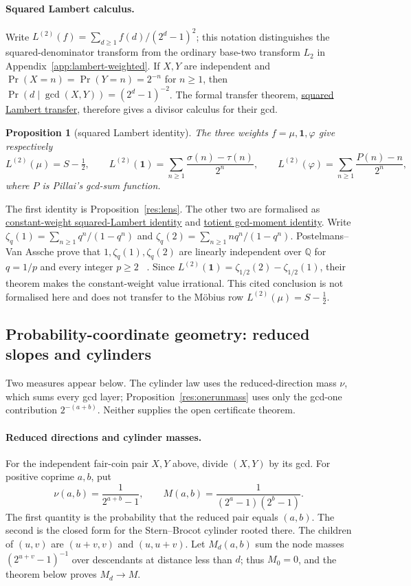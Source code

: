 \documentclass[11pt]{article}
\newcommand{\commit}{312b96c0d149ed466725c62d4ef24cfc91bca34e}
\newcommand{\repobase}{https://github.com/wcook04/plectis-lean-erdos249-257/blob/\commit}
\newcommand{\PK}{Erdos249257}
\newcommand{\lword}[4]{\href{\repobase/\PK/#1\#L#2}{#4}}
\newtheorem{proposition}[theorem]{Proposition}
\theoremstyle{definition}
\theoremstyle{remark}
\newcommand{\Q}{\mathbb{Q}}
\newcommand{\ph}{\varphi}
\begin{document}
{\paragraph{Squared Lambert calculus.}\label{sec:squared}
Write \(L^{(2)}(f)=\sum_{d\ge1}f(d)/(2^d-1)^2\); this notation distinguishes
the squared-denominator transform from the ordinary base-two transform $L_2$
in Appendix~\ref{app:lambert-weighted}.  If $X,Y$ are independent and
$\Pr(X=n)=\Pr(Y=n)=2^{-n}$ for $n\ge1$, then
$\Pr(d\mid\gcd(X,Y))=(2^d-1)^{-2}$.  The formal transfer theorem,
\lword{GcdMomentCalculus.lean}{105}{tsum_lambert_linear_weight_sq_pure}{squared Lambert transfer},
therefore gives a divisor calculus for their gcd.
\begin{proposition}[squared Lambert identity]\label{res:gcdmoment}
The three weights \(f=\mu,\mathbf 1,\ph\) give respectively
\[
 L^{(2)}(\mu)=S-\tfrac12,\qquad
 L^{(2)}(\mathbf 1)=\sum_{n\ge1}\frac{\sigma(n)-\tau(n)}{2^n},\qquad
 L^{(2)}(\ph)=\sum_{n\ge1}\frac{P(n)-n}{2^n},
\]
where \(P\) is Pillai's gcd-sum function.
\end{proposition}
\noindent The first identity is Proposition~\ref{res:lens}.  The other two are
formalised as \lword{GcdMomentCalculus.lean}{216}{tsum_one_div_mersenne_sq_eq_sigma_sub_tau_series}{constant-weight squared-Lambert identity} and
\lword{GcdMomentCalculus.lean}{235}{tsum_totient_div_mersenne_sq_eq_gcd_moment_series}{totient gcd-moment identity}.
Write
\(\zeta_q(1)=\sum_{n\ge1}q^n/(1-q^n)\) and
\(\zeta_q(2)=\sum_{n\ge1}nq^n/(1-q^n)\).
Postelmans--Van Assche prove that \(1,\zeta_q(1),\zeta_q(2)\) are linearly
independent over \(\Q\) for $q=1/p$ and every integer $p\ge2$
~\cite[Theorem~1.3]{postelmansvanassche}.  Since
$L^{(2)}(\mathbf1)=\zeta_{1/2}(2)-\zeta_{1/2}(1)$, their theorem makes the
constant-weight value irrational.  This cited conclusion is not formalised
here and does not transfer to the M\"obius row $L^{(2)}(\mu)=S-\tfrac12$.

\subsection{Probability-coordinate geometry: reduced slopes and cylinders}
\label{app:lambert-probability}

Two measures appear below.  The cylinder law uses the reduced-direction mass
$\nu$, which sums every gcd layer; Proposition~\ref{res:onerunmass} uses only
the gcd-one contribution $2^{-(a+b)}$.  Neither supplies the open certificate
theorem.

\paragraph{Reduced directions and cylinder masses.}
For the independent fair-coin pair $X,Y$ above, divide $(X,Y)$ by its gcd.
For positive coprime \(a,b\), put
\[
  \nu(a,b)=\frac1{2^{a+b}-1},
  \qquad
  M(a,b)=\frac1{(2^a-1)(2^b-1)}.
\]
The first quantity is the probability that the reduced pair equals $(a,b)$.
The second is the closed form for the Stern--Brocot cylinder rooted there.
The children of $(u,v)$ are $(u+v,v)$ and $(u,u+v)$.  Let $M_d(a,b)$ sum the
node masses $(2^{u+v}-1)^{-1}$ over descendants at distance less than $d$;
thus $M_0=0$, and the theorem below proves $M_d\to M$.

}
\end{document}
